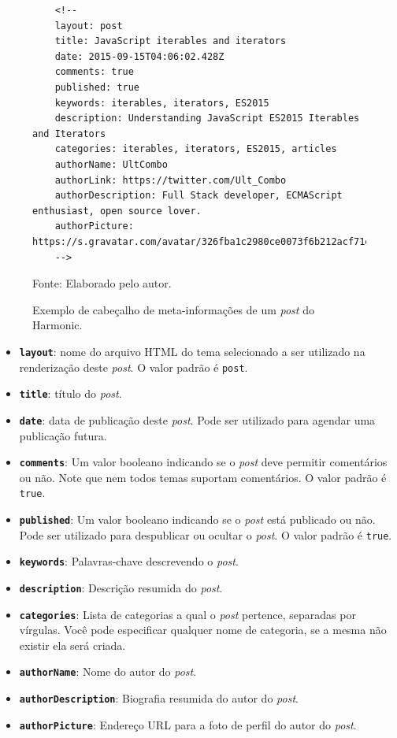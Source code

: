 \documentclass[ppginf, pep]{esinucpel}
\newcommand{\code}[1]{\texttt{#1}}
\begin{document}
\begin{figure}[H]
    \centering
    \caption{Exemplo de cabeçalho de meta-informações de um \textit{post} do Harmonic.}
    
    \lstset{language=HTML}
    \begin{lstlisting}
    <!--
    layout: post
    title: JavaScript iterables and iterators
    date: 2015-09-15T04:06:02.428Z
    comments: true
    published: true
    keywords: iterables, iterators, ES2015
    description: Understanding JavaScript ES2015 Iterables and Iterators
    categories: iterables, iterators, ES2015, articles
    authorName: UltCombo
    authorLink: https://twitter.com/Ult_Combo
    authorDescription: Full Stack developer, ECMAScript enthusiast, open source lover.
    authorPicture: https://s.gravatar.com/avatar/326fba1c2980ce0073f6b212acf71ea0
    -->
    \end{lstlisting}
    
    Fonte: Elaborado pelo autor.
    \label{fig:post_header}
\end{figure}

\begin{itemize}
	\item \textbf{\code{layout}}: nome do arquivo HTML do tema selecionado a ser utilizado na renderização deste \textit{post}. O valor padrão é \code{post}.
	\item \textbf{\code{title}}: título do \textit{post}.
	\item \textbf{\code{date}}: data de publicação deste \textit{post}. Pode ser utilizado para agendar uma publicação futura.
	\item \textbf{\code{comments}}: Um valor booleano indicando se o \textit{post} deve permitir comentários ou não. Note que nem todos temas suportam comentários. O valor padrão é \code{true}.
	\item \textbf{\code{published}}: Um valor booleano indicando se o \textit{post} está publicado ou não. Pode ser utilizado para despublicar ou ocultar o \textit{post}. O valor padrão é \code{true}.
	\item \textbf{\code{keywords}}: Palavras-chave descrevendo o \textit{post}.
	\item \textbf{\code{description}}: Descrição resumida do \textit{post}.
	\item \textbf{\code{categories}}: Lista de categorias a qual o \textit{post} pertence, separadas por vírgulas. Você pode especificar qualquer nome de categoria, se a mesma não existir ela será criada.
	\item \textbf{\code{authorName}}: Nome do autor do \textit{post}.
	\item \textbf{\code{authorDescription}}: Biografia resumida do autor do \textit{post}.
	\item \textbf{\code{authorPicture}}: Endereço URL para a foto de perfil do autor do \textit{post}.
\end{itemize}
\end{document}
